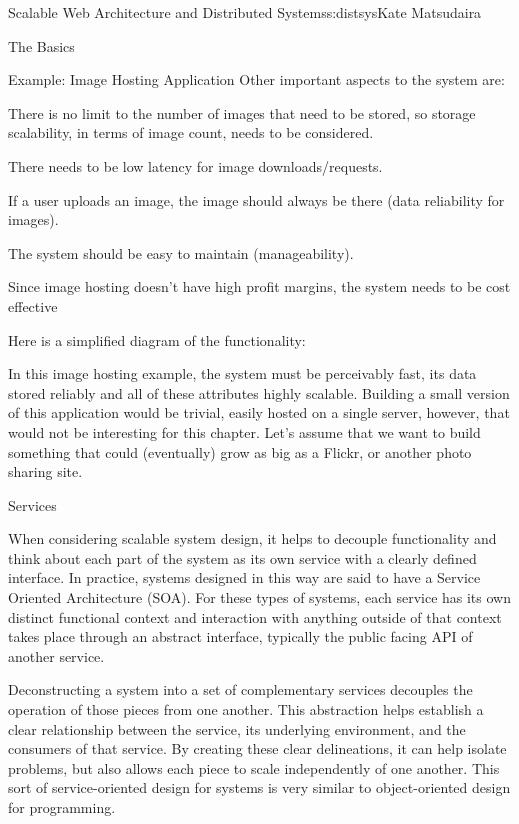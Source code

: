\begin{aosachapter}{Scalable Web Architecture and Distributed Systems}{s:distsys}{Kate Matsudaira}
\begin{aosasect1}{The Basics}
\begin{aosasect2}{Example: Image Hosting Application}
Other important aspects to the system are:

\begin{aosaitemize}

\item There is no limit to the number of images that need to be
  stored, so storage scalability, in terms of image count, needs to be
  considered.

\item There needs to be low latency for image downloads/requests.

\item If a user uploads an image, the image should always be there
  (data reliability for images).

\item The system should be easy to maintain (manageability).

\item Since image hosting doesn’t have high profit margins, the system
  needs to be cost effective

\end{aosaitemize}

Here is a simplified diagram of the functionality:


In this image hosting example, the system must be perceivably fast,
its data stored reliably and all of these attributes highly
scalable. Building a small version of this application would be
trivial, easily hosted on a single server, however, that would not be
interesting for this chapter. Let’s assume that we want to build
something that could (eventually) grow as big as a Flickr, or another
photo sharing site.

\end{aosasect2}

\begin{aosasect2}{Services}

When considering scalable system design, it helps to decouple
functionality and think about each part of the system as its own
service with a clearly defined interface. In practice, systems
designed in this way are said to have a Service Oriented Architecture
(SOA). For these types of systems, each service has its own distinct
functional context and interaction with anything outside of that
context takes place through an abstract interface, typically the
public facing API of another service.

Deconstructing a system into a set of complementary services decouples
the operation of those pieces from one another. This abstraction helps
establish a clear relationship between the service, its underlying
environment, and the consumers of that service. By creating these
clear delineations, it can help isolate problems, but also allows each
piece to scale independently of one another. This sort of
service-oriented design for systems is very similar to object-oriented
design for programming.


\end{aosasect2}
\end{aosasect1}
\end{aosachapter}
